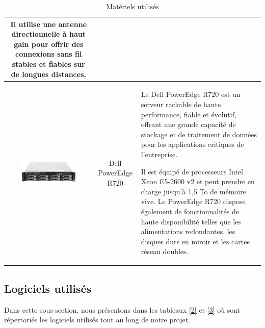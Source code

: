 \begin{table}[H]
\begin{center}
\begin{tabular}{|c{3cm}|c{3cm}|l{10cm}|}
Il utilise une antenne directionnelle à haut gain pour offrir des connexions sans fil stables et fiables sur de longues distances.  \\
\hline
\includegraphics[width=3cm]{Images/dellr720.png} & Dell PowerEdge R720 & Le Dell PowerEdge R720 est un serveur rackable de haute performance, fiable et évolutif, offrant une grande capacité de stockage et de traitement de données pour les applications critiques de l'entreprise. 

Il est équipé de processeurs Intel Xeon E5-2600 v2 et peut prendre en charge jusqu'à 1,5 To de mémoire vive. Le PowerEdge R720 dispose également de fonctionnalités de haute disponibilité telles que les alimentations redondantes, les disques durs en miroir et les cartes réseau doubles. \\
\hline
\end{tabular}
\caption{Matériels utilisés}
\label{1}
\end{center}
\end{table}


\subsection{Logiciels utilisés}

Dans cette sous-section, nous présentons dans les tableaux \ref{2} et \ref{3} où sont répertoriés les logiciels utilisés tout au long de notre projet. 


